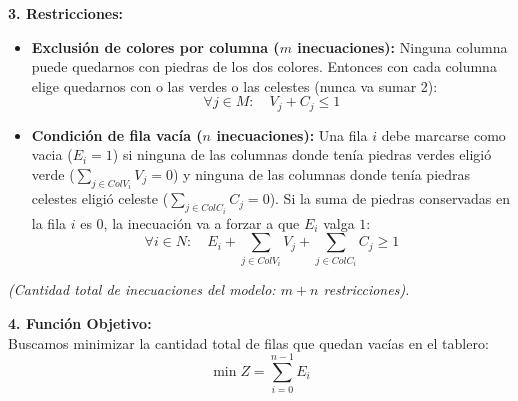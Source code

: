 \textbf{3. Restricciones:}
\begin{itemize}
    \item \textbf{Exclusión de colores por columna ($m$ inecuaciones):} Ninguna columna puede quedarnos con piedras de los dos colores. Entonces con cada columna elige quedarnos con o las verdes o las celestes (nunca va sumar 2):
    \[ \forall j \in M: \quad V_j + C_j \le 1 \]
    \item \textbf{Condición de fila vacía ($n$ inecuaciones):} Una fila $i$ debe marcarse como vacia ($E_i = 1$) si ninguna de las columnas donde tenía piedras verdes eligió verde ($\sum_{j \in ColV_i} V_j = 0$) y ninguna de las columnas donde tenía piedras celestes eligió celeste ($\sum_{j \in ColC_i} C_j = 0$). Si la suma de piedras conservadas en la fila $i$ es $0$, la inecuación va a forzar a que $E_i$ valga $1$:
    \[ \forall i \in N: \quad E_i + \sum_{j \in ColV_i} V_j + \sum_{j \in ColC_i} C_j \ge 1 \]
\end{itemize}
\textit{(Cantidad total de inecuaciones del modelo: $m + n$ restricciones).}

\textbf{4. Función Objetivo:} \\
Buscamos minimizar la cantidad total de filas que quedan vacías en el tablero:
\[ \min Z = \sum_{i=0}^{n-1} E_i \]









